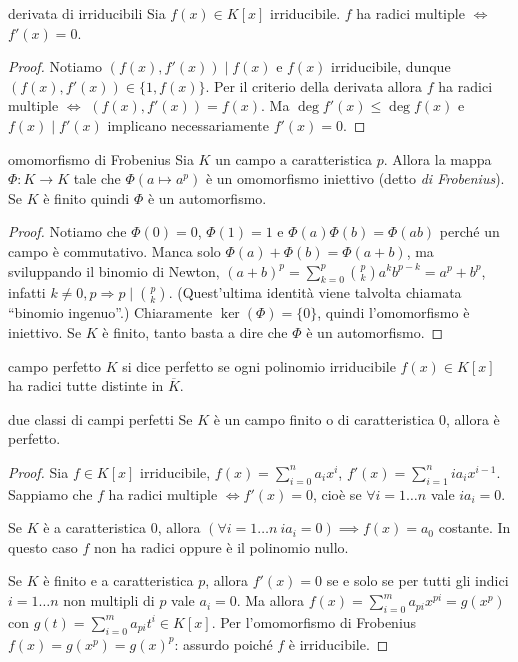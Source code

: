\begin{corollary}{derivata di irriducibili}
    Sia $f(x) \in K[x]$ irriducibile.  $f$ ha radici multiple $\Leftrightarrow$ $f'(x) = 0$.
\end{corollary}
\begin{proof}
    Notiamo $(f(x),f'(x)) \mid f(x)$ e $f(x)$ irriducibile, dunque $(f(x),f'(x)) \in \{1,f(x)\}$. Per il criterio della derivata allora $f$ ha radici multiple $\Leftrightarrow$ $(f(x),f'(x)) = f(x)$. Ma $\deg f'(x) \leq \deg f(x)$ e $f(x) \mid f'(x)$ implicano necessariamente $f'(x)=0$.
\end{proof}
\begin{proposition}{omomorfismo di Frobenius}
    Sia $K$ un campo a caratteristica $p$. Allora la mappa $\Phi: K \rightarrow K$ tale che $\Phi(a \mapsto a^p)$ è un omomorfismo iniettivo (detto \textit{di Frobenius}). Se $K$ è finito quindi $\Phi$ è un automorfismo.
\end{proposition}
\begin{proof}
    Notiamo che $\Phi(0)=0$, $\Phi(1)=1$ e $\Phi(a)\Phi(b) = \Phi(ab)$ perché un campo è commutativo. Manca solo $\Phi(a) + \Phi(b) = \Phi(a+b)$, ma sviluppando il binomio di Newton, $(a+b)^p = \sum_{k=0}^p \binom{p}{k}a^kb^{p-k} = a^p+b^p$, infatti $k\neq0,p \Rightarrow p \mid \binom{p}{k}$. (Quest'ultima identità viene talvolta chiamata ``binomio ingenuo''.) Chiaramente $\ker(\Phi) = \{0\}$, quindi l'omomorfismo è iniettivo. Se $K$ è finito, tanto basta a dire che $\Phi$ è un automorfismo.
\end{proof}
\begin{definition}{campo perfetto}
    $K$ si dice perfetto se ogni polinomio irriducibile $f(x) \in K[x]$ ha radici tutte distinte in $\overline{K}$.
\end{definition}
\begin{proposition}{due classi di campi perfetti}
    Se $K$ è un campo finito o di caratteristica 0, allora è perfetto.
\end{proposition}
\begin{proof}
    Sia $f\in K[x]$ irriducibile, $f(x) = \sum_{i=0}^n a_ix^i$, $f'(x) = \sum_{i = 1}^{n}{i a_i x^{i-1}}$. Sappiamo che $f$ ha radici multiple $\iff f'(x) = 0$, cioè se $\forall i = 1 \dots n$ vale  $i a_i = 0$.
    
    Se $K$ è a caratteristica 0, allora $(\forall i = 1 \dots n \ i a_i = 0) \implies f(x) = a_0$ costante. In questo caso $f$ non ha radici oppure è il polinomio nullo.
    
    Se $K$ è finito e a caratteristica $p$, allora $f'(x) = 0$ se e solo se per tutti gli indici $i = 1 \dots n$ non multipli di $p$ vale $a_i = 0$. Ma allora $f(x) = \sum_{i=0}^m a_{pi}x^{pi} = g(x^p)$ con $g(t) = \sum_{i=0}^{m} a_{pi}t^i \in K[x]$. Per l'omomorfismo di Frobenius $f(x) = g(x^p) = g(x)^p$: assurdo poiché $f$ è irriducibile.
\end{proof}

